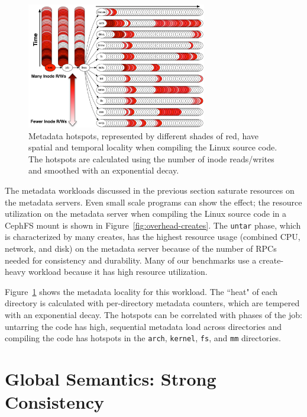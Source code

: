 \begin{figure}[t]
  \centering	
  \includegraphics[width=0.7\textwidth]{./chapters/mantle/figures/workload-tar.png}
  \caption{Metadata hotspots, represented by different shades of red, have
  spatial and temporal locality when compiling the Linux source code. The
  hotspots are calculated using the number of inode reads/writes and
  smoothed with an exponential decay. \label{figure:workload-tar}}
\end{figure}

The metadata workloads discussed in the previous section saturate resources on
the metadata servers.  Even small scale programs can show the effect; the
resource utilization on the metadata server when compiling the Linux source
code in a CephFS mount is shown in Figure~\ref{fig:overhead-creates}.  The
\texttt{untar} phase, which is characterized by many creates, has the highest
resource usage (combined CPU, network, and disk) on the metadata server because
of the number of RPCs needed for consistency and durability.  Many of our
benchmarks use a create-heavy workload because it has high resource
utilization.

Figure~\ref{figure:workload-tar} shows the metadata locality for this workload.
The ``heat" of each directory is calculated with per-directory metadata
counters, which are tempered with an exponential decay.  The hotspots can be
correlated with phases of the job: untarring the code has high, sequential
metadata load across directories and compiling the code has hotspots in the
\texttt{arch}, \texttt{kernel}, \texttt{fs}, and \texttt{mm} directories.  

\section{Global Semantics: Strong Consistency}

